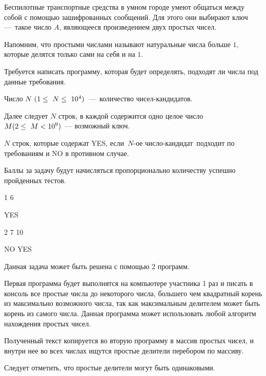 
Беспилотные транспортные средства в умном городе умеют общаться между собой с помощью зашифрованных сообщений. Для этого они выбирают ключ — такое число $A$, являющееся произведением двух простых чисел.

Напомним, что простыми числами называют натуральные числа больше $1$, которые делятся только сами на себя и на $1$.

Требуется написать программу, которая будет определять, подходят ли числа под данные требования.


Число $N\space (1 \leq N \leq 10^4)$ — количество чисел-кандидатов.

Далее следует $N$ строк, в каждой содержится одно целое число\\ $ M\space (2 \leq M < 10^9)$ — возможный ключ.

\outputfmtSection

$N$ строк, которые содержат YES, если $N$-ое число-кандидат подходит по требованиям и NO в противном случае.

\markSection

Баллы за задачу будут начисляться пропорционально количеству успешно пройденных тестов.


\begin{myverbbox}[\small]{\vinput}
    1
    6
\end{myverbbox}
\begin{myverbbox}[\small]{\voutput}
    YES
\end{myverbbox}


\begin{myverbbox}[\small]{\vinput}
    2
    7
    10
\end{myverbbox}
\begin{myverbbox}[\small]{\voutput}
    NO
    YES
\end{myverbbox}

\solutionSection

Данная задача может быть решена с помощью 2 программ. 

Первая программа будет выполнятся на компьютере участника 1 раз и писать в консоль все простые числа до некоторого числа, большего чем квадратный корень из максимально возможного числа, так как максимальным делителем может быть корень из самого числа. Данная программа может использовать любой алгоритм нахождения простых чисел.

Полученный текст копируется во вторую программу в массив простых чисел, и внутри нее во всех числах ищутся простые делители перебором по массиву.

Следует отметить, что простые делители могут быть одинаковыми.

